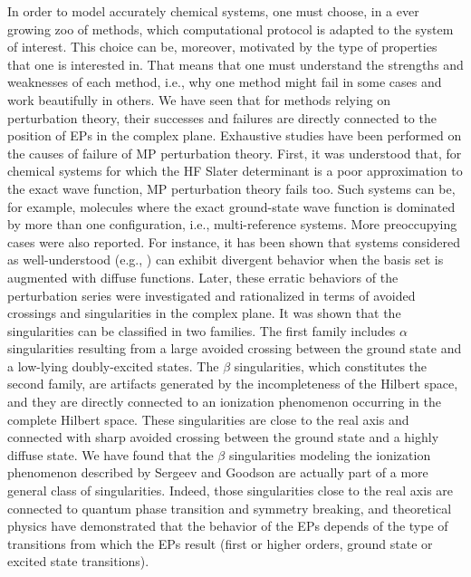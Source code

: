 \documentclass[aps,prb,reprint,noshowkeys,superscriptaddress]{revtex4-1}
\newcommand{\latin}[1]{#1}
\newcommand{\ie}{\latin{i.e.}}
\newcommand{\eg}{\latin{e.g.}}
\begin{document}
In order to model accurately chemical systems, one must choose, in a ever growing zoo of methods, which computational protocol is adapted to the system of interest.
This choice can be, moreover, motivated by the type of properties that one is interested in.
That means that one must understand the strengths and weaknesses of each method, \ie, why one method might fail in some cases and work beautifully in others. 
We have seen that for methods relying on perturbation theory, their successes and failures are directly connected to the position of EPs in the complex plane. 
Exhaustive studies have been performed on the causes of failure of MP perturbation theory. 
First, it was understood that, for chemical systems for which the HF Slater determinant is a poor approximation to the exact wave function, MP perturbation theory fails too. Such systems can be, for example, molecules where the exact ground-state wave function is dominated by more than one configuration, \ie, multi-reference systems. 
More preoccupying cases were also reported. 
For instance, it has been shown that systems considered as well-understood (\eg, ) can exhibit divergent behavior when the basis set is augmented with diffuse functions. 
Later, these erratic behaviors of the perturbation series were investigated and rationalized in terms of avoided crossings and singularities in the complex plane. It was shown that the singularities can be classified in two families. 
The first family includes $\alpha$ singularities resulting from a large avoided crossing between the ground state and a low-lying doubly-excited states. 
The $\beta$ singularities, which constitutes the second family, are artifacts generated by the incompleteness of the Hilbert space, and they are directly connected to an ionization phenomenon occurring in the complete Hilbert space. 
These singularities are close to the real axis and connected with sharp avoided crossing between the ground state and a highly diffuse state. 
We have found that the $\beta$ singularities modeling the ionization phenomenon described by Sergeev and Goodson are actually part of a more general class of singularities. Indeed, those singularities close to the real axis are connected to quantum phase transition and symmetry breaking, and theoretical physics have demonstrated that the behavior of the EPs depends of the type of transitions from which the EPs result (first or higher orders, ground state or excited state transitions).
\end{document}
